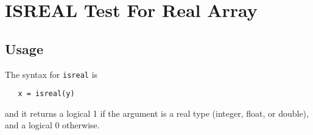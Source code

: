 \section{ISREAL Test For Real Array}

\subsection{Usage}

The syntax for \verb|isreal| is 
\begin{verbatim}
   x = isreal(y)
\end{verbatim}
and it returns a logical 1 if the argument is a real type
(integer, float, or double), and a logical 0 otherwise.
